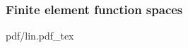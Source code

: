 \begin{frame}
  \frametitle{Finite element function spaces}

  \begin{center}
    \def\svgwidth{\textwidth}
    {pdf/lin.pdf_tex}
  \end{center}

\end{frame}
